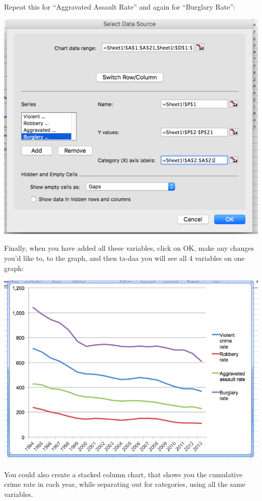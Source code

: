\documentclass[]{book}
\theoremstyle{definition}
\theoremstyle{definition}
\theoremstyle{definition}
\theoremstyle{remark}
\begin{document}
Repeat this for ``Aggravated Assault Rate'' and again for ``Burglary
Rate'':

\includegraphics{imgs/comp_c_5.png}

Finally, when you have added all these variables, click on OK, make any
changes you'd like to, to the graph, and then ta-daa you will see all 4
variables on one graph:

\includegraphics{imgs/comp_c_6.png}

You could also create a stacked column chart, that shows you the
cumulative crime rate in each year, while separating out for categories,
using all the same variables.
\end{document}
